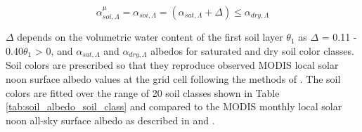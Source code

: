 \documentclass[twoside,10pt]{report}
\begin{document}
\begin{equation}
    \alpha_{soi,\Lambda}^{\mu} = \alpha_{soi,\Lambda} = (\alpha_{sat,\Lambda} + \Delta) \leq \alpha_{dry,\Lambda}
    \label{eq:soil_albedo_moist}
\end{equation}

\noindent $\Delta$ depends on the volumetric water content of the first soil layer $\theta_1$ as $\Delta$ = 0.11 -  0.40$\theta_1$ > 0, and $\alpha_{sat,\Lambda}$ and $\alpha_{dry,\Lambda}$ albedos for saturated and dry soil color classes. Soil colors are prescribed so that they reproduce observed MODIS local solar noon surface albedo values at the grid cell following the methods of \citet{Lawrence2007}.  The soil colors are fitted over the range of 20 soil classes shown in Table \ref{tab:soil_albedo_soil_class} and compared to the MODIS monthly local solar noon all-sky surface albedo as described in \citet{Strahler1999} and \citet{Schaaf2002}.  

\begin{table}[]
\caption{Dry and saturated soil albedos}
\label{tab:soil_albedo_soil_class}
\end{table}
\end{document}
